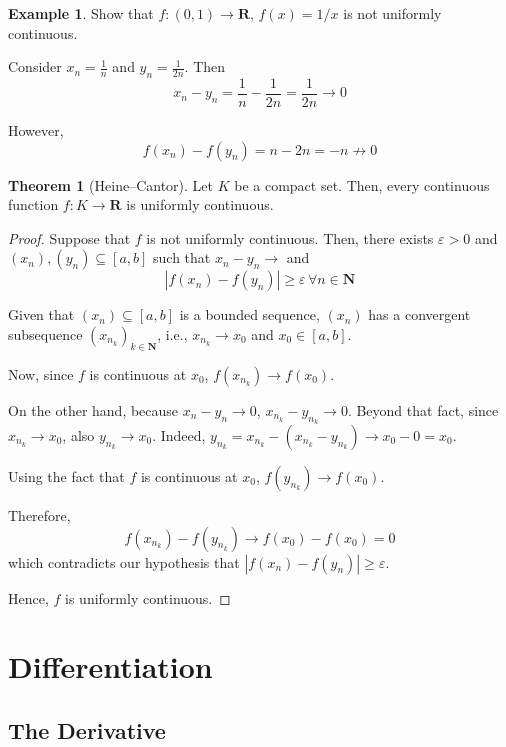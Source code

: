 \documentclass[tikz,12pt,a4paper]{article}
\theoremstyle{definition}
\newtheorem{theorem}{Theorem}[section]
\newtheorem{example}{Example}[section]
\begin{document}
\begin{example}
	Show that $f : (0,1) \longrightarrow \textbf{R}$, $f(x) = 1/x$ is not uniformly continuous.
	
	Consider $x_n = \frac{1}{n}$ and $y_n = \frac{1}{2n}$. Then
	\[
		x_n - y_n = \frac{1}{n} - \frac{1}{2n} = \frac{1}{2n} \longrightarrow 0
	\]
	
	However,
	\[
		f(x_n) - f(y_n) = n - 2n = -n \not\longrightarrow 0
	\]
\end{example}

\begin{theorem}[Heine–Cantor]
	Let $K$ be a compact set. Then, every continuous function $f : K \longrightarrow \textbf{R}$ is uniformly continuous.
\end{theorem}

\begin{proof}
	Suppose that $f$ is not uniformly continuous. Then, there exists $\varepsilon > 0$ and $(x_n), (y_n) \subseteq [a,b]$ such that $x_n - y_n \longrightarrow $ and
	\[
		|f(x_n) - f(y_n)| \geq \varepsilon \, \forall n \in \textbf{N}
	\]
	
	Given that $(x_n) \subseteq [a,b]$ is a bounded sequence, $(x_n)$ has a convergent subsequence $(x_{n_k})_{k \in \textbf{N}}$, i.e., $x_{n_k} \longrightarrow x_0$ and $x_0 \in [a,b]$.
	
	Now, since $f$ is continuous at $x_0$, $f(x_{n_k}) \longrightarrow f(x_0)$.
	
	On the other hand, because $x_n - y_n \longrightarrow 0$, $x_{n_k} - y_{n_k} \longrightarrow 0$. Beyond that fact, since $x_{n_k} \longrightarrow x_0$, also $y_{n_k} \longrightarrow x_0$. Indeed, $y_{n_k} = x_{n_k} - (x_{n_k} - y_{n_k}) \longrightarrow x_0 - 0 = x_0$.
	
	Using the fact that $f$ is continuous at $x_0$, $f(y_{n_k}) \longrightarrow f(x_0)$. 
	
	Therefore,
	\[
		f(x_{n_k}) - f(y_{n_k}) \longrightarrow f(x_0) - f(x_0) = 0
	\]
	which contradicts our hypothesis that $|f(x_n) - f(y_n)| \geq \varepsilon$.
	
	Hence, $f$ is uniformly continuous.
\end{proof}

\newpage

\section{Differentiation}

\subsection{The Derivative}
\end{document}
